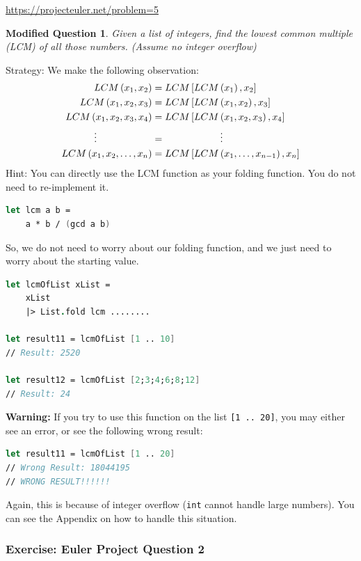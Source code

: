 \documentclass[12pt]{article}
\newtheorem*{modQuestion*}{Modified Question}
\begin{document}
\url{https://projecteuler.net/problem=5}

\begin{modQuestion*}
Given a list of integers, find the lowest common multiple (LCM) of all those numbers. (Assume no integer overflow)
\end{modQuestion*}
Strategy: We make the following observation:
\begin{align*}
LCM\left(x_1, x_2\right) &= LCM\left[LCM\left(x_1\right), x_2\right]
\\LCM\left(x_1, x_2, x_3\right) &= LCM\left[LCM\left(x_1, x_2\right), x_3\right]
\\LCM\left(x_1, x_2, x_3, x_4\right) &= LCM\left[LCM\left(x_1, x_2, x_3\right), x_4\right]
\\ \vdots \hspace{2.0cm}&= \hspace{2.0cm} \vdots
\\LCM\left(x_1, x_2, \ldots, x_n\right) &= LCM\left[LCM\left(x_1, \ldots, x_{n-1}\right), x_n\right]
\end{align*}
Hint: You can directly use the LCM function as your folding function. You do not need to re-implement it. 
\begin{lstlisting}[language=FSharp]
let lcm a b = 
    a * b / (gcd a b)
\end{lstlisting}
So, we do not need to worry about our folding function, and we just need to worry about the starting value.

\begin{lstlisting}[language=FSharp]
let lcmOfList xList =
    xList
    |> List.fold lcm ........

let result11 = lcmOfList [1 .. 10]
// Result: 2520

let result12 = lcmOfList [2;3;4;6;8;12]
// Result: 24
\end{lstlisting}

{\Large \textbf{Warning:}} If you try to use this function on the list \texttt{[1 .. 20]}, you may either see an error, or see the following wrong result:
\begin{lstlisting}[language=FSharp]
let result11 = lcmOfList [1 .. 20]
// Wrong Result: 18044195
// WRONG RESULT!!!!!!
\end{lstlisting}
Again, this is because of integer overflow (\texttt{int} cannot handle large numbers). You can see the Appendix on how to handle this situation.

\pagebreak

\subsubsection*{Exercise: Euler Project Question 2}
\end{document}
